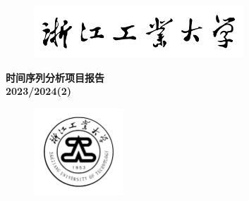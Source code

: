 \documentclass{article} %
\begin{document}
\begin{titlepage}
    \begin{center}
        \begin{figure}[H]
            \centering
            \includegraphics[width=0.7\textwidth]{./pic/校名.pdf}
          \end{figure} 
          \huge \textbf{时间序列分析项目报告} \\ 
          \large \textbf{2023/2024(2)}
          \begin{figure}[H]
            \centering
            \includegraphics[width=0.3\textwidth]{./pic/校徽.pdf}
          \end{figure}

          \vspace{0.5cm}


\end{center}
\end{titlepage}
\end{document}
